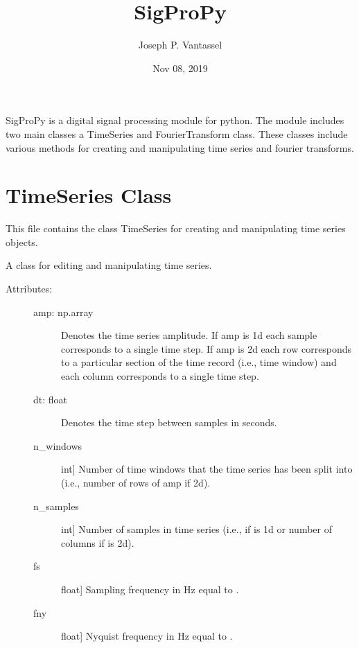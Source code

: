 \documentclass[letterpaper,10pt,english]{sphinxmanual}
\title{SigProPy}
\date{Nov 08, 2019}
\author{Joseph P.\@{} Vantassel}
\begin{document}
\pagestyle{empty}
\sphinxmaketitle
\pagestyle{plain}
\sphinxtableofcontents
\pagestyle{normal}
\label{\detokenize{index::doc}}


SigProPy is a digital signal processing module for python. The module includes
two main classes a TimeSeries and FourierTransform class. These classes include
various methods for creating and manipulating time series and fourier transforms.


\chapter{TimeSeries Class}
\label{\detokenize{index:timeseries-class}}
This file contains the class TimeSeries for creating and manipulating
time series objects.


\begin{fulllineitems}
A class for editing and manipulating time series.
\begin{description}
\item[{Attributes:}] \leavevmode\begin{description}
\item[{amp: np.array}] \leavevmode
Denotes the time series amplitude. If amp is 1d each sample
corresponds to a single time step. If amp is 2d each row 
corresponds to a particular section of the time record 
(i.e., time window) and each column corresponds to a single
time step.

\item[{dt: float }] \leavevmode
Denotes the time step between samples in seconds.

\item[{n\_windows}] \leavevmode{[}int{]}
Number of time windows that the time series has been split
into (i.e., number of rows of amp if 2d).

\item[{n\_samples}] \leavevmode{[}int{]}
Number of samples in time series (i.e.,  if 
is 1d or number of columns if  is 2d).

\item[{fs}] \leavevmode{[}float{]}
Sampling frequency in Hz equal to .

\item[{fny}] \leavevmode{[}float{]}
Nyquist frequency in Hz equal to .


\end{description}
\end{description}
\end{fulllineitems}
\end{document}
